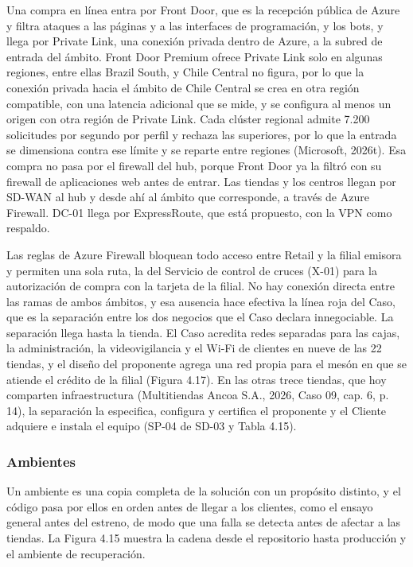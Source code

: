 \documentclass[11pt]{article}
\begin{document}
Una compra en línea entra por Front Door, que es la recepción pública de Azure y filtra ataques a las páginas y a las interfaces de programación, y los bots, y llega por Private Link, una conexión privada dentro de Azure, a la subred de entrada del ámbito. Front Door Premium ofrece Private Link solo en algunas regiones, entre ellas Brazil South, y Chile Central no figura, por lo que la conexión privada hacia el ámbito de Chile Central se crea en otra región compatible, con una latencia adicional que se mide, y se configura al menos un origen con otra región de Private Link. Cada clúster regional admite 7.200 solicitudes por segundo por perfil y rechaza las superiores, por lo que la entrada se dimensiona contra ese límite y se reparte entre regiones (Microsoft, 2026t). Esa compra no pasa por el firewall del hub, porque Front Door ya la filtró con su firewall de aplicaciones web antes de entrar. Las tiendas y los centros llegan por SD-WAN al hub y desde ahí al ámbito que corresponde, a través de Azure Firewall. DC-01 llega por ExpressRoute, que está propuesto, con la VPN como respaldo.

Las reglas de Azure Firewall bloquean todo acceso entre Retail y la filial emisora y permiten una sola ruta, la del Servicio de control de cruces (X-01) para la autorización de compra con la tarjeta de la filial. No hay conexión directa entre las ramas de ambos ámbitos, y esa ausencia hace efectiva la línea roja del Caso, que es la separación entre los dos negocios que el Caso declara innegociable. La separación llega hasta la tienda. El Caso acredita redes separadas para las cajas, la administración, la videovigilancia y el Wi-Fi de clientes en nueve de las 22 tiendas, y el diseño del proponente agrega una red propia para el mesón en que se atiende el crédito de la filial (Figura 4.17). En las otras trece tiendas, que hoy comparten infraestructura (Multitiendas Ancoa S.A., 2026, Caso 09, cap. 6, p. 14), la separación la especifica, configura y certifica el proponente y el Cliente adquiere e instala el equipo (SP-04 de SD-03 y Tabla 4.15).

\subsubsection{Ambientes}

Un ambiente es una copia completa de la solución con un propósito distinto, y el código pasa por ellos en orden antes de llegar a los clientes, como el ensayo general antes del estreno, de modo que una falla se detecta antes de afectar a las tiendas. La Figura 4.15 muestra la cadena desde el repositorio hasta producción y el ambiente de recuperación.
\end{document}
